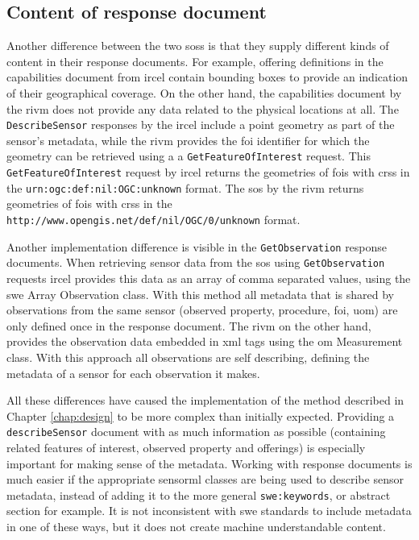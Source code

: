 \subsection{Content of response document}
\begin{sloppypar}
Another difference between the two \aclp{sos} is that they supply different kinds of content in their response documents. For example, offering definitions in the capabilities document from \ac{ircel} contain bounding boxes to provide an indication of their geographical coverage. On the other hand, the capabilities document by the \ac{rivm} does not provide any data related to the physical locations at all. The \texttt{DescribeSensor} responses by the \ac{ircel} include a point geometry as part of the sensor's metadata, while the \ac{rivm} provides the \ac{foi} identifier for which the geometry can be retrieved using a a \texttt{GetFeatureOfInterest} request. This \texttt{GetFeatureOfInterest} request by \ac{ircel} returns the geometries of \acp{foi} with \acp{crs} in the \texttt{urn:ogc:def:nil:OGC:unknown} format. The \ac{sos} by the \ac{rivm} returns geometries of \acp{foi} with \acp{crs} in the \texttt{http://www.opengis.net/def/nil/OGC/0/unknown} format. 
\end{sloppypar}

\begin{sloppypar}
Another implementation difference is visible in the \texttt{GetObservation} response documents. When retrieving sensor data from the \ac{sos} using \texttt{GetObservation} requests \ac{ircel} provides this data as an array of comma separated values, using the \ac{swe} Array Observation class. With this method all metadata that is shared by observations from the same sensor (observed property, procedure, \ac{foi}, \ac{uom}) are only defined once in the response document. The \ac{rivm} on the other hand, provides the observation data embedded in \ac{xml} tags using the \ac{om} Measurement class. With this approach all observations are self describing, defining the metadata of a sensor for each observation it makes.   
\end{sloppypar}

All these differences have caused the implementation of the method described in Chapter \ref{chap:design} to be more complex than initially expected. Providing a \texttt{describeSensor} document with as much information as possible (containing related features of interest, observed property and offerings) is especially important for making sense of the metadata. Working with response documents is much easier if the appropriate \ac{sensorml} classes are being used to describe sensor metadata, instead of adding it to the more general \texttt{swe:keywords}, or abstract section for example. It is not inconsistent with \ac{swe} standards to include metadata in one of these ways, but it does not create machine understandable content. 

